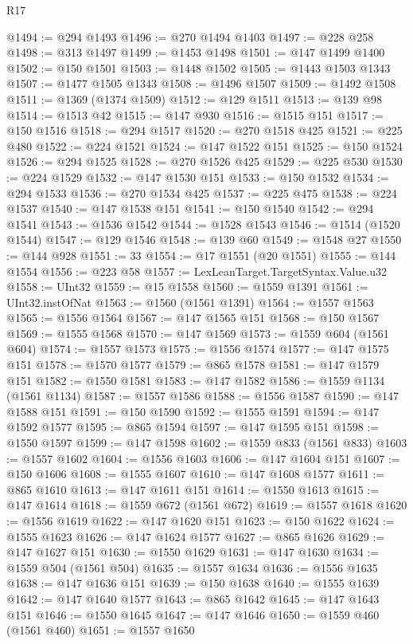 \begin{lexlean}{R17}
\begin{coremodule}
@1494 := @294 @1493
@1496 := @270 @1494 @1403
@1497 := @228 @258
@1498 := @313 @1497
@1499 := @1453 @1498
@1501 := @147 @1499 @1400
@1502 := @150 @1501
@1503 := @1448 @1502
@1505 := @1443 @1503 @1343
@1507 := @1477 @1505 @1343
@1508 := @1496 @1507
@1509 := @1492 @1508
@1511 := @1369 (@1374 @1509)
@1512 := @129 @1511
@1513 := @139 @98
@1514 := @1513 @42
@1515 := @147 @930
@1516 := @1515 @151
@1517 := @150 @1516
@1518 := @294 @1517
@1520 := @270 @1518 @425
@1521 := @225 @480
@1522 := @224 @1521
@1524 := @147 @1522 @151
@1525 := @150 @1524
@1526 := @294 @1525
@1528 := @270 @1526 @425
@1529 := @225 @530
@1530 := @224 @1529
@1532 := @147 @1530 @151
@1533 := @150 @1532
@1534 := @294 @1533
@1536 := @270 @1534 @425
@1537 := @225 @475
@1538 := @224 @1537
@1540 := @147 @1538 @151
@1541 := @150 @1540
@1542 := @294 @1541
@1543 := @1536 @1542
@1544 := @1528 @1543
@1546 := @1514 (@1520 @1544)
@1547 := @129 @1546
@1548 := @139 @60
@1549 := @1548 @27
@1550 := @144 @928
@1551 := 33
@1554 := @17 @1551 (@20 @1551)
@1555 := @144 @1554
@1556 := @223 @58
@1557 := LexLeanTarget.TargetSyntax.Value.u32
@1558 := UInt32
@1559 := @15 @1558
@1560 := @1559 @1391
@1561 := UInt32.instOfNat
@1563 := @1560 (@1561 @1391)
@1564 := @1557 @1563
@1565 := @1556 @1564
@1567 := @147 @1565 @151
@1568 := @150 @1567
@1569 := @1555 @1568
@1570 := @147 @1569
@1573 := @1559 @604 (@1561 @604)
@1574 := @1557 @1573
@1575 := @1556 @1574
@1577 := @147 @1575 @151
@1578 := @1570 @1577
@1579 := @865 @1578
@1581 := @147 @1579 @151
@1582 := @1550 @1581
@1583 := @147 @1582
@1586 := @1559 @1134 (@1561 @1134)
@1587 := @1557 @1586
@1588 := @1556 @1587
@1590 := @147 @1588 @151
@1591 := @150 @1590
@1592 := @1555 @1591
@1594 := @147 @1592 @1577
@1595 := @865 @1594
@1597 := @147 @1595 @151
@1598 := @1550 @1597
@1599 := @147 @1598
@1602 := @1559 @833 (@1561 @833)
@1603 := @1557 @1602
@1604 := @1556 @1603
@1606 := @147 @1604 @151
@1607 := @150 @1606
@1608 := @1555 @1607
@1610 := @147 @1608 @1577
@1611 := @865 @1610
@1613 := @147 @1611 @151
@1614 := @1550 @1613
@1615 := @147 @1614
@1618 := @1559 @672 (@1561 @672)
@1619 := @1557 @1618
@1620 := @1556 @1619
@1622 := @147 @1620 @151
@1623 := @150 @1622
@1624 := @1555 @1623
@1626 := @147 @1624 @1577
@1627 := @865 @1626
@1629 := @147 @1627 @151
@1630 := @1550 @1629
@1631 := @147 @1630
@1634 := @1559 @504 (@1561 @504)
@1635 := @1557 @1634
@1636 := @1556 @1635
@1638 := @147 @1636 @151
@1639 := @150 @1638
@1640 := @1555 @1639
@1642 := @147 @1640 @1577
@1643 := @865 @1642
@1645 := @147 @1643 @151
@1646 := @1550 @1645
@1647 := @147 @1646
@1650 := @1559 @460 (@1561 @460)
@1651 := @1557 @1650

\end{coremodule}
\end{lexlean}
